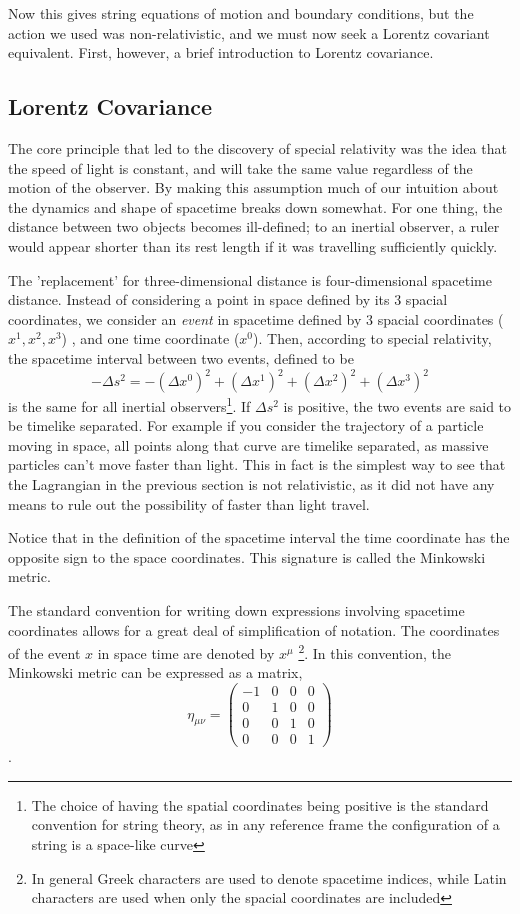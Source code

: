 \documentclass[a4paper,12pt]{article}
\numberwithin{equation}{section}
\begin{document}
Now this gives string equations of motion and boundary conditions, but the action we used was non-relativistic, and we must now seek a Lorentz covariant equivalent. First, however, a brief introduction to Lorentz covariance.
\subsection{Lorentz Covariance}
The core principle that led to the discovery of special relativity was the idea that the speed of light is constant, and will take the same value regardless of the motion of the observer. By making this assumption much of our intuition about the dynamics and shape of spacetime breaks down somewhat. For one thing, the distance between two objects becomes ill-defined; to an inertial observer, a ruler would appear shorter than its rest length if it was travelling sufficiently quickly.

The 'replacement' for three-dimensional distance is four-dimensional spacetime distance. Instead of considering a point in space defined by its 3 spacial coordinates, we consider an \emph{event} in spacetime defined by 3 spacial coordinates ($x^1, x^2, x^3$) , and one time coordinate ($x^0$). Then, according to special relativity, the spacetime interval between two events, defined to be 
\begin{equation}
-\Delta s^2 = -(\Delta x^0)^2 + (\Delta x^1)^2+(\Delta x^2)^2+(\Delta x^3)^2
\end{equation}
is the same for all inertial observers\footnote{The choice of having the spatial coordinates being positive is the standard convention for string theory, as in any reference frame the configuration of a string is a space-like curve}. If $\Delta s^2$ is positive, the two events are said to be timelike separated. For example if you consider the trajectory of a particle moving in space, all points along that curve are timelike separated, as massive particles can't move faster than light. This in fact is the simplest way to see that the Lagrangian in the previous section is not relativistic, as it did not have any means to rule out the possibility of faster than light travel.

Notice that in the definition of the spacetime interval the time coordinate has the opposite sign to the space coordinates. This signature is called the Minkowski metric.

The standard convention for writing down expressions involving spacetime coordinates allows for a great deal of simplification of notation. The coordinates of the event $x$ in space time are denoted by $x^\mu$ \footnote{In general Greek characters are used to denote spacetime indices, while Latin characters are used when only the spacial coordinates are included}. In this convention, the Minkowski metric can be expressed as a matrix, 
\begin{equation}
\eta _{\mu \nu} =  \begin{pmatrix} -1 & 0 & 0 & 0 \\ 0 & 1 & 0 & 0 \\ 0 & 0 & 1 & 0 \\ 0 & 0 & 0 & 1 \end{pmatrix} 
\end{equation}.
\end{document}
